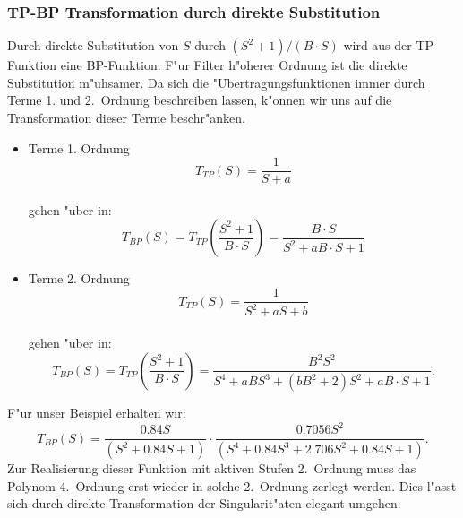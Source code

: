 \subsubsection{TP-BP Transformation durch direkte Substitution}
Durch direkte Substitution von  $S$ durch $(S^2+1)/(B\cdot S)$
wird aus der TP-Funktion eine BP-Funktion. F"ur Filter h"oherer Ordnung
ist die direkte Substitution m"uhsamer. Da sich die "Uber\-tragungs\-funktionen immer durch
Terme 1. und 2.~Ordnung beschreiben lassen, k"onnen wir uns auf die
Transformation dieser Terme beschr"anken.
\begin{itemize}
\item Terme 1. Ordnung
\begin{equation*}
T_{TP}(S)=\frac{1}{S+a}
\end{equation*}\\
\nit gehen "uber in:
\begin{equation*}
        T_{BP}(S)=T_{TP}\left(\frac{S^{2}+1}{B\cdot S}\right)=\frac{B\cdot S}{S^{2}+aB\cdot S+1}
\end{equation*}

\item Terme 2. Ordnung
\begin{equation*}
        T_{TP}(S)=\frac{1}{S^{2}+aS+b}
\end{equation*}\\
\nit gehen "uber in:
\begin{equation*}
        T_{BP}(S)=T_{TP}\left(\frac{S^{2}+1}{B\cdot S}\right)=\frac{B^{2}S^{2}}{S^{4}+aB
        S^{3}+(bB^{2}+2)S^{2}+aB\cdot S+1}.
\end{equation*}
\end{itemize}
  F"ur unser Beispiel erhalten wir:
\[
        T_{BP}(S)=\frac{0.84S}{(S^{2}+0.84S+1)} \cdot \frac{0.7056S^{2}}{(S^{4}
        +0.84S^{3}+2.706S^{2}+0.84S+1)}.
\]
Zur Realisierung dieser Funktion mit aktiven Stufen 2.~Ordnung muss das
Polynom 4.~Ordnung erst wieder in solche 2.~Ordnung zerlegt werden.
Dies l"asst sich durch direkte Transformation der Singularit"aten elegant
umgehen.
